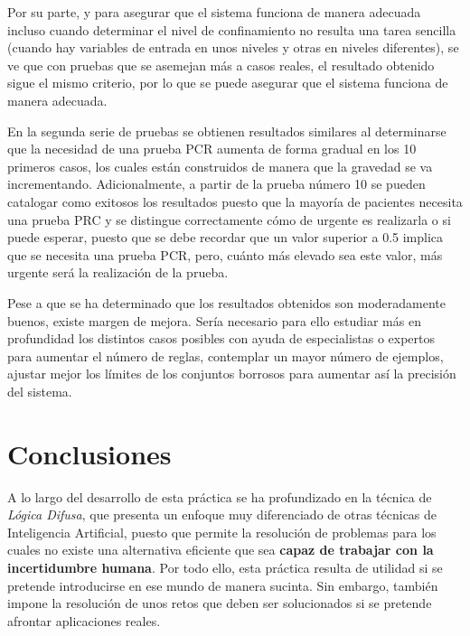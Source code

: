 \documentclass[12pt,a4paper, xcolor=table]{article}
\begin{document}
  Por su parte, y para asegurar que el sistema funciona de manera adecuada incluso cuando determinar el nivel de confinamiento no resulta una tarea sencilla (cuando hay variables de entrada en unos niveles y otras en niveles diferentes), se ve que con pruebas que se asemejan más a casos reales, el resultado obtenido sigue el mismo criterio, por lo que se puede asegurar que el sistema funciona de manera adecuada.

  \vspace{4mm}

  En la segunda serie de pruebas se obtienen resultados similares al determinarse que la necesidad de una prueba PCR aumenta de forma gradual en los 10 primeros casos, los cuales están construidos de manera que la gravedad se va incrementando. Adicionalmente, a partir de la prueba número 10 se pueden catalogar como exitosos los resultados puesto que la mayoría de pacientes necesita una prueba PRC y se distingue correctamente cómo de urgente es realizarla o si puede esperar, puesto que se debe recordar que un valor superior a 0.5 implica que se necesita una prueba PCR, pero, cuánto más elevado sea este valor, más urgente será la realización de la prueba.

  \vspace{5mm}

  Pese a que se ha determinado que los resultados obtenidos son moderadamente buenos, existe margen de mejora. Sería necesario para ello estudiar más en profundidad los distintos casos posibles con ayuda de especialistas o expertos para aumentar el número de reglas, contemplar un mayor número de ejemplos, ajustar mejor los límites de los conjuntos borrosos para aumentar así la precisión del sistema.

\newpage

\section{Conclusiones}

  A lo largo del desarrollo de esta práctica se ha profundizado en la técnica de \textit{Lógica Difusa}, que presenta un enfoque muy diferenciado de otras técnicas de Inteligencia Artificial, puesto que permite la resolución de problemas para los cuales no existe una alternativa eficiente que sea \textbf{capaz de trabajar con la incertidumbre humana}. Por todo ello, esta práctica resulta de utilidad si se pretende introducirse en ese mundo de manera sucinta. Sin embargo, también impone la resolución de unos retos que deben ser solucionados si se pretende afrontar aplicaciones reales.
\end{document}
